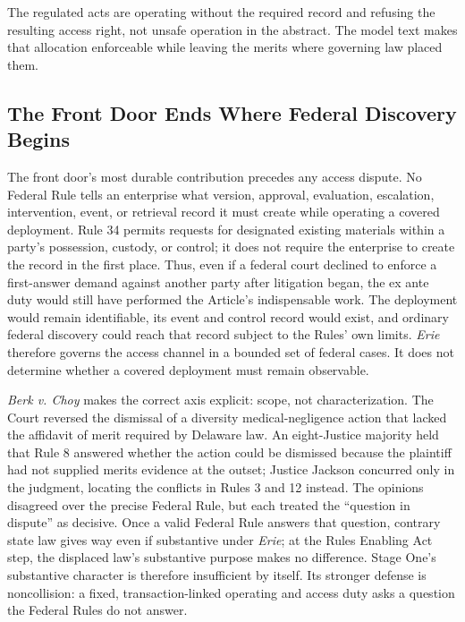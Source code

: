 The regulated acts are operating without the required record and refusing the resulting access right, not unsafe operation in the abstract. The model text makes that allocation enforceable while leaving the merits where governing law placed them.

\subsection{The Front Door Ends Where Federal Discovery Begins}
\label{sec:erie}

The front door's most durable contribution precedes any access dispute. No Federal Rule tells an enterprise what version, approval, evaluation, escalation, intervention, event, or retrieval record it must create while operating a covered deployment. Rule 34 permits requests for designated existing materials within a party's possession, custody, or control; it does not require the enterprise to create the record in the first place. Thus, even if a federal court declined to enforce a first-answer demand against another party after litigation began, the ex ante duty would still have performed the Article's indispensable work. The deployment would remain identifiable, its event and control record would exist, and ordinary federal discovery could reach that record subject to the Rules' own limits. \emph{Erie} therefore governs the access channel in a bounded set of federal cases. It does not determine whether a covered deployment must remain observable.

\emph{Berk v. Choy} makes the correct axis explicit: scope, not characterization. The Court reversed the dismissal of a diversity medical-negligence action that lacked the affidavit of merit required by Delaware law. An eight-Justice majority held that Rule 8 answered whether the action could be dismissed because the plaintiff had not supplied merits evidence at the outset; Justice Jackson concurred only in the judgment, locating the conflicts in Rules 3 and 12 instead. The opinions disagreed over the precise Federal Rule, but each treated the ``question in dispute'' as decisive. Once a valid Federal Rule answers that question, contrary state law gives way even if substantive under \emph{Erie}; at the Rules Enabling Act step, the displaced law's substantive purpose makes no difference. Stage One's substantive character is therefore insufficient by itself. Its stronger defense is noncollision: a fixed, transaction-linked operating and access duty asks a question the Federal Rules do not answer.

